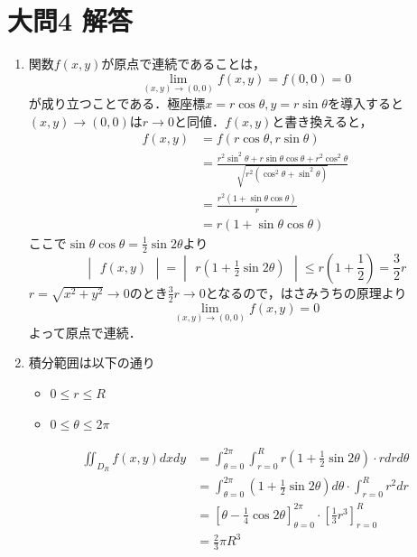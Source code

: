 \documentclass[dvipdfmx]{jsreport}
\begin{document}
\section{大問4 解答}
\begin{souanswer} %
\begin{enumerate}
	\item 関数$f(x, y)$が原点で連続であることは，
\begin{equation*}
	\lim_{(x, y)\to (0, 0)} f(x, y)= f(0, 0)= 0
\end{equation*}
	が成り立つことである．極座標$x= r\cos{\theta}, y= r\sin{\theta}$を導入すると$(x, y)\to (0, 0)$は$r\to 0$と同値．$f(x, y)$と書き換えると，
\begin{align*}
	f(x, y)
	&= f(r\cos{\theta}, r\sin{\theta})\\
	&= \frac{r^2\sin^2{\theta}+ r\sin{\theta}\cos{\theta}+ r^2\cos^2{\theta}}{\sqrt{r^2(\cos^2{\theta}+ \sin^2{\theta})}}\\
	&= \frac{r^2(1+ \sin{\theta}\cos{\theta})}{r}\\
	&= r(1+ \sin{\theta}\cos{\theta})
\end{align*}
	ここで$\sin{\theta}\cos{\theta}= \frac{1}{2}\sin{2\theta}$より
\begin{equation*}
	\begin{vmatrix}f(x, y)\end{vmatrix}= \begin{vmatrix}r\left(1+ \frac{1}{2}\sin{2\theta}\right)\end{vmatrix}\le r\left(1+ \frac{1}{2}\right)= \frac{3}{2}r
\end{equation*}
	$r= \sqrt{x^2+ y^2}\to 0$のとき$\frac{3}{2}r\to 0$となるので，はさみうちの原理より
\begin{equation*}
	\lim_{(x, y)\to (0, 0)} f(x, y)= 0
\end{equation*}
	よって原点で連続．

	\item 積分範囲は以下の通り
\begin{itemize}
	\item $0\le r\le R$
	\item $0\le \theta\le 2\pi$
\end{itemize}
\begin{align*}
	\iint_{D_R} f(x, y) dxdy
	&= \int_{\theta= 0}^{2\pi}\int_{r= 0}^R r\left(1+ \frac{1}{2}\sin{2\theta}\right)\cdot rdrd\theta\\
	&= \int_{\theta= 0}^{2\pi} \left(1+ \frac{1}{2}\sin{2\theta}\right)d\theta\cdot \int_{r= 0}^R r^2 dr\\
	&= \left[\theta- \frac{1}{4}\cos{2\theta}\right]_{\theta= 0}^{2\pi}\cdot \left[\frac{1}{3}r^3\right]_{r= 0}^ R\\
	&= \frac{2}{3}\pi R^3
\end{align*}
\end{enumerate}
\end{souanswer}
\end{document}
